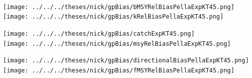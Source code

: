 \documentclass[ xcolor = pdftex, dvipsnames, table ]{beamer}
\begin{document}
%
\begin{frame}%
$~$
\hspace*{-1.25cm}
\begin{minipage}[h!]{0.33\textwidth}
\hspace*{0.25cm}
\texttt{[image: ../../../theses/nick/gpBias/bMSYRelBiasPellaExpKT45.png]}\\
\hspace*{0.25cm}
\texttt{[image: ../../../theses/nick/gpBias/kRelBiasPellaExpKT45.png]}
\end{minipage}
\begin{minipage}[h!]{0.33\textwidth}
\hspace*{0.75cm}
\texttt{[image: ../../../theses/nick/gpBias/catchExpKT45.png]}\\
\hspace*{0.75cm}
\texttt{[image: ../../../theses/nick/gpBias/msyRelBiasPellaExpKT45.png]}
\end{minipage}
\begin{minipage}[h!]{0.33\textwidth}
\hspace*{1cm}
\texttt{[image: ../../../theses/nick/gpBias/directionalBiasPellaExpKT45.png]}\\
\hspace*{1cm}
\texttt{[image: ../../../theses/nick/gpBias/fMSYRelBiasPellaExpKT45.png]}
\end{minipage}
\end{frame}
\end{document}
